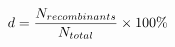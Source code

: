 \documentclass[preview]{standalone}
\begin{document}
\begin{align*}
\special{dvisvgm:raw <g id='unique000'>}d = \frac{N_{recombinants}}{N_{total}} \times 100\%\special{dvisvgm:raw </g>}
\end{align*}
\end{document}
